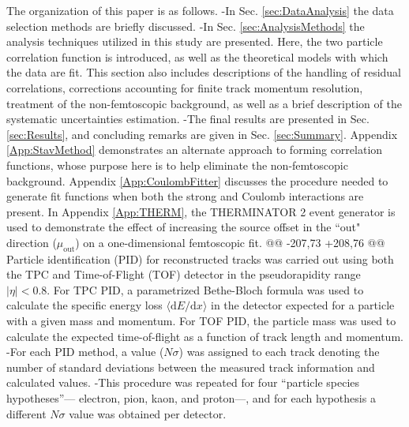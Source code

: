  The organization of this paper is as follows.  
-In Sec. \ref{sec:DataAnalysis} the data selection methods are briefly discussed.
-In Sec. \ref{sec:AnalysisMethods} the analysis techniques utilized in this study are presented.  
\underline{}
\underline{}
 Here, the two particle correlation function is introduced, as well as the theoretical models with which the data are fit.  
 This section also includes descriptions of the handling of residual correlations, corrections accounting for finite track momentum resolution, treatment of the non-femtoscopic background, as well as a brief description of the systematic uncertainties estimation.  
-The final results are presented in Sec. \ref{sec:Results}, and concluding remarks are given in Sec. \ref{sec:Summary}.
\underline{}
 Appendix \ref{App:StavMethod} demonstrates an alternate approach to forming correlation functions, whose purpose here is to help eliminate the non-femtoscopic background.
 Appendix \ref{App:CoulombFitter} discusses the procedure needed to generate fit functions when both the strong and Coulomb interactions are present.
 In Appendix \ref{App:THERM}, the THERMINATOR 2 event generator is used to demonstrate the effect of increasing the source offset in the ``out" direction ($\mu_{\mathrm{out}}$) on a one-dimensional femtoscopic fit.
@@ -207,73 +208,76 @@
 Particle identification (PID) for reconstructed tracks was carried out using both the TPC and Time-of-Flight (TOF) detector \cite{Abelev:2014ffa, Akindinov:2013tea} in the pseudorapidity range $|\eta| < 0.8$.  
 For TPC PID, a parametrized Bethe-Bloch formula was used to calculate the specific energy loss $\langle \mathrm{d}E/\mathrm{d}x \rangle$ in the detector expected for a particle with a given mass and momentum.  
 For TOF PID, the particle mass was used to calculate the expected time-of-flight as a function of track length and momentum.  
-For each PID method, a value ($N\sigma$) was assigned to each track denoting the number of standard deviations between the measured track information and calculated values.  
-This procedure was repeated for four ``particle species hypotheses''--- electron, pion, kaon, and proton---, and for each hypothesis a different $N\sigma$ value was obtained per detector.
\underline{}
\underline{}
 
